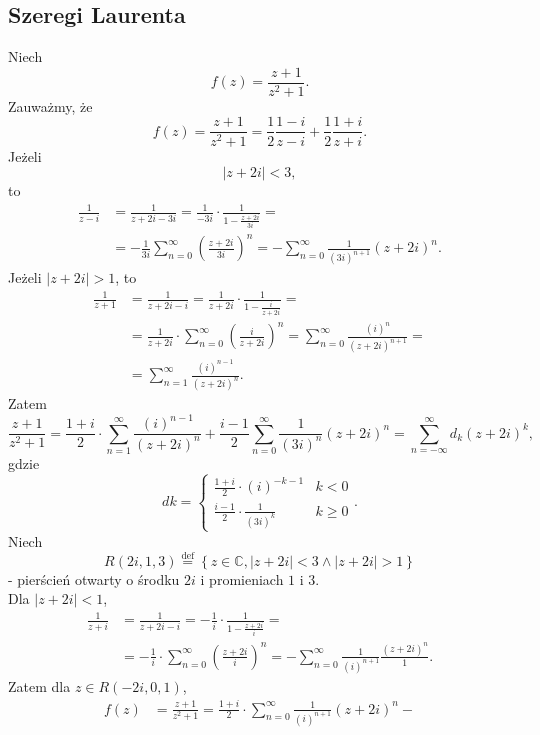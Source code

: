 \documentclass[../main.tex]{subfiles}
\begin{document}
\subsection{Szeregi Laurenta}
\begin{przyklad}
    Niech
    \[
        f(z) = \frac{z+1}{z^2 + 1}
    .\]
Zauważmy, że
\[
    f(z) = \frac{z+1}{z^2 + 1} = \frac{1}{2}\frac{1-i}{z - i} + \frac{1}{2}\frac{1+i}{z+i}
.\]
Jeżeli
\[
\left| z+2i \right| < 3
,\]
to
\begin{align*}
    \frac{1}{z-i} &= \frac{1}{z + 2i - 3i} = \frac{1}{-3i}\cdot \frac{1}{1-\frac{z+2i}{3i}} =\\
    &= -\frac{1}{3i}\sum_{n=0}^{\infty} \left( \frac{z+2i}{3i} \right) ^{n} = - \sum_{n=0}^{\infty} \frac{1}{(3i)^{n+1}}\left( z+2i \right)^n
.\end{align*}
Jeżeli $|z+2i| > 1$, to
\begin{align*}
    \frac{1}{z+1} &= \frac{1}{z + 2i - i} = \frac{1}{z+2i}\cdot \frac{1}{1- \frac{i}{z+2i}} =\\
    &= \frac{1}{z+2i} \cdot \sum_{n=0}^{\infty} \left( \frac{i}{z+2i} \right) ^n = \sum_{n=0}^{\infty} \frac{(i)^n}{(z+2i)^{n+1}} =\\
    &=\sum_{n=1}^{\infty} \frac{(i)^{n-1}}{(z+2i)^n}
.\end{align*}
Zatem
\[
    \frac{z+1}{z^2 + 1} = \frac{1+i}{2} \cdot \sum_{n=1}^{\infty} \frac{(i)^{n-1}}{(z+2i)^n} + \frac{i-1}{2} \sum_{n=0}^{\infty} \frac{1}{(3i)^n}(z+2i)^n = \sum_{n=-\infty}^{\infty} d_k (z+2i)^k
,\]
gdzie
\[
dk = \begin{cases}
    \frac{1+i}{2}\cdot (i)^{-k-1} & k <0 \\
    \frac{i - 1}{2}\cdot \frac{1}{(3i)^{k}} & k \ge 0
\end{cases}
.\]
Niech
    \[
        R(2i, 1, 3) \overset{\text{def}}{=} \left\{ z\in\mathbb{C}, |z+2i| < 3 \land |z + 2i| > 1 \right\}
    \]
    - pierścień otwarty o środku $2i$ i promieniach $1$ i $3$.\\
    Dla $|z+2i| < 1$,
    \begin{align*}
        \frac{1}{z+i} &= \frac{1}{z+2i-i} = -\frac{1}{i} \cdot \frac{1}{1 - \frac{z+2i}{i}} =\\
        &= -\frac{1}{i} \cdot \sum_{n=0}^{\infty} \left(\frac{z+2i}{i}\right)^n = -\sum_{n=0}^{\infty} \frac{1}{(i)^{n+1}}\frac{(z+2i)^n}{1}
    .\end{align*}
Zatem dla $z\in R(-2i, 0, 1)$,
\begin{align*}
    f(z) &= \frac{z+1}{z^2 + 1} = \frac{1+i}{2}\cdot \sum_{n=0}^{\infty} \frac{1}{(i)^{n+1}}(z+2i)^n -\\

\end{align*}
\end{przyklad}
\end{document}
